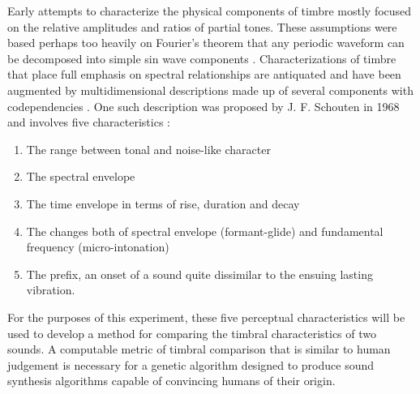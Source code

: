\documentclass[12pt]{article}
\begin{document}
Early attempts to characterize the physical components of timbre mostly focused on the relative amplitudes and ratios of partial tones. These assumptions were based perhaps too heavily on Fourier's theorem that any periodic waveform can be decomposed into simple sin wave components \citep{helmholtz1857physiological, helmholtz1954sensations}. Characterizations of timbre that place full emphasis on spectral relationships are antiquated and have been augmented by multidimensional descriptions made up of several components with codependencies \citep{erickson1975sound}. One such description was proposed by J. F. Schouten in 1968 and involves five characteristics \citep{schouten1968perception, erickson1975sound}:
\begin{enumerate}
\item
The range between tonal and noise-like character
\item
The spectral envelope
\item
The time envelope in terms of rise, duration and decay
\item
The changes both of spectral envelope (formant-glide) and fundamental frequency (micro-intonation)
\item
The prefix, an onset of a sound quite dissimilar to the ensuing lasting vibration.
\end{enumerate}

For the purposes of this experiment, these five perceptual characteristics will be used to develop a method for comparing the timbral characteristics of two sounds. A computable metric of timbral comparison that is similar to human judgement is necessary for a genetic algorithm designed to produce sound synthesis algorithms capable of convincing humans of their origin.
\end{document}
